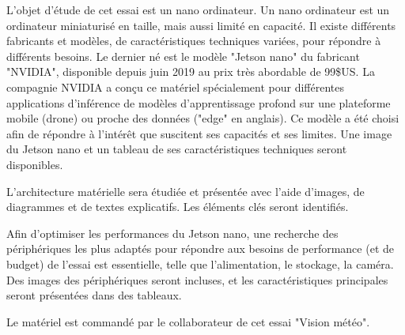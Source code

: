 ﻿\par L'objet d'étude de cet essai est un nano ordinateur. Un nano ordinateur est un ordinateur miniaturisé en taille, mais aussi limité en capacité. Il existe différents fabricants et modèles, de caractéristiques techniques variées, pour répondre à différents besoins. Le dernier né est le modèle "Jetson nano" du fabricant "NVIDIA", disponible depuis juin 2019 au prix très abordable de 99\$US. La compagnie NVIDIA a conçu ce matériel spécialement pour différentes applications d'inférence de modèles d'apprentissage profond sur une plateforme mobile (drone) ou proche des données ("edge" en anglais). Ce modèle a été choisi afin de répondre à l'intérêt que suscitent ses capacités et ses limites. Une image du Jetson nano et un tableau de ses caractéristiques techniques seront disponibles. 
\par L'architecture matérielle sera étudiée et présentée avec l'aide d'images, de diagrammes et de textes explicatifs. Les éléments clés seront identifiés.
\par Afin d'optimiser les performances du Jetson nano, une recherche des périphériques les plus adaptés pour répondre aux besoins de performance (et de budget) de l'essai est essentielle, telle que l'alimentation, le stockage, la caméra. Des images des périphériques seront incluses, et les caractéristiques principales seront présentées dans des tableaux.
\par Le matériel est commandé par le collaborateur de cet essai "Vision météo".